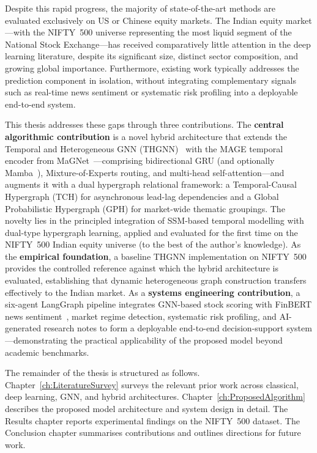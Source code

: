 \documentclass[a4paper,11pt]{report}
\begin{document}
Despite this rapid progress, the majority of state-of-the-art methods are evaluated exclusively on US or Chinese equity markets. The Indian equity market---with the NIFTY~500 universe representing the most liquid segment of the National Stock Exchange---has received comparatively little attention in the deep learning literature, despite its significant size, distinct sector composition, and growing global importance. Furthermore, existing work typically addresses the prediction component in isolation, without integrating complementary signals such as real-time news sentiment or systematic risk profiling into a deployable end-to-end system.

This thesis addresses these gaps through three contributions. The \textbf{central algorithmic contribution} is a novel hybrid architecture that extends the Temporal and Heterogeneous GNN (THGNN)~\cite{xiang2022thgnn} with the MAGE temporal encoder from MaGNet~\cite{tan2025magnet}---comprising bidirectional GRU (and optionally Mamba~\cite{gu2024mamba}), Mixture-of-Experts routing, and multi-head self-attention---and augments it with a dual hypergraph relational framework: a Temporal-Causal Hypergraph (TCH) for asynchronous lead-lag dependencies and a Global Probabilistic Hypergraph (GPH) for market-wide thematic groupings. The novelty lies in the principled integration of SSM-based temporal modelling with dual-type hypergraph learning, applied and evaluated for the first time on the NIFTY~500 Indian equity universe (to the best of the author's knowledge). As the \textbf{empirical foundation}, a baseline THGNN implementation on NIFTY~500 provides the controlled reference against which the hybrid architecture is evaluated, establishing that dynamic heterogeneous graph construction transfers effectively to the Indian market. As a \textbf{systems engineering contribution}, a six-agent LangGraph pipeline integrates GNN-based stock scoring with FinBERT news sentiment~\cite{araci2019finbert}, market regime detection, systematic risk profiling, and AI-generated research notes to form a deployable end-to-end decision-support system---demonstrating the practical applicability of the proposed model beyond academic benchmarks.

The remainder of the thesis is structured as follows. Chapter~\ref{ch:LiteratureSurvey} surveys the relevant prior work across classical, deep learning, GNN, and hybrid architectures. Chapter~\ref{ch:ProposedAlgorithm} describes the proposed model architecture and system design in detail. The Results chapter reports experimental findings on the NIFTY~500 dataset. The Conclusion chapter summarises contributions and outlines directions for future work.
\end{document}
